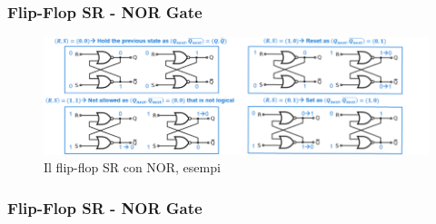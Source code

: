 \begin{frame}
	\frametitle{Flip-Flop SR - NOR Gate}
	 
	\begin{figure}[!htbp] 
		\centering
		\includegraphics[width=1.0\linewidth]{images/5_memory/flip_flop_sr_nor.png}
		\caption{Il flip-flop SR con NOR, esempi}
	\end{figure}
	
\end{frame}

\begin{frame}

	\frametitle{Flip-Flop SR - NOR Gate}

		\centering
		\label{fig:flip_flop_sr_nor}

\end{frame}


